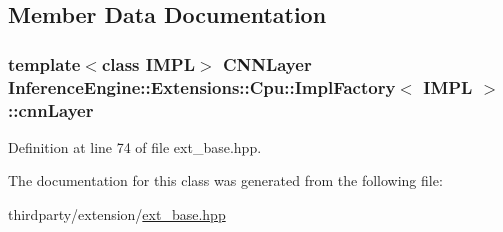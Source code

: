 \subsection{Member Data Documentation}
\subsubsection[{\texorpdfstring{cnn\+Layer}{cnnLayer}}]{\setlength{\rightskip}{0pt plus 5cm}template$<$class I\+M\+PL$>$ C\+N\+N\+Layer {\bf Inference\+Engine\+::\+Extensions\+::\+Cpu\+::\+Impl\+Factory}$<$ I\+M\+PL $>$\+::cnn\+Layer\hspace{0.3cm}{\ttfamily [protected]}}\hypertarget{classInferenceEngine_1_1Extensions_1_1Cpu_1_1ImplFactory_a03cc9ae94115704d93b27a9a62b0619a}{}\label{classInferenceEngine_1_1Extensions_1_1Cpu_1_1ImplFactory_a03cc9ae94115704d93b27a9a62b0619a}


Definition at line 74 of file ext\+\_\+base.\+hpp.



The documentation for this class was generated from the following file\+:\begin{DoxyCompactItemize}
\item 
thirdparty/extension/\hyperlink{ext__base_8hpp}{ext\+\_\+base.\+hpp}\end{DoxyCompactItemize}
